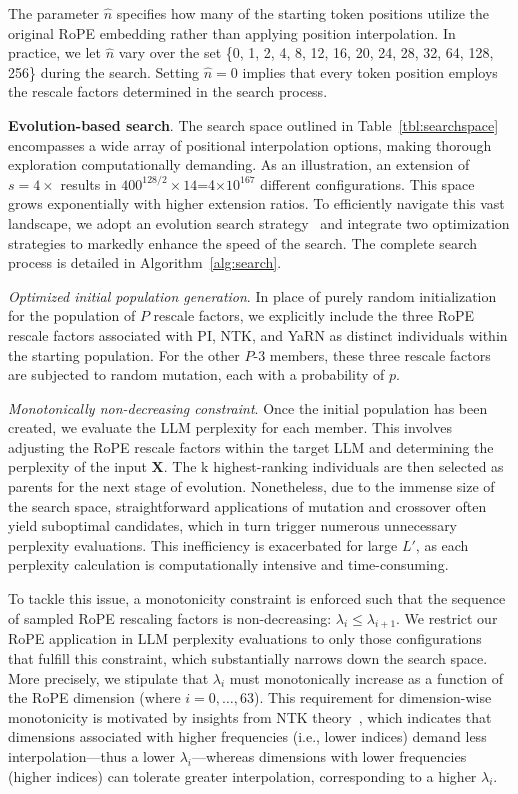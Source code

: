 The parameter $\hat{n}$ specifies how many of the starting token positions utilize the original RoPE embedding rather than applying position interpolation. In practice, we let $\hat{n}$ vary over the set \{0, 1, 2, 4, 8, 12, 16, 20, 24, 28, 32, 64, 128, 256\} during the search. Setting $\hat{n}=0$ implies that every token position employs the rescale factors determined in the search process.

\textbf{Evolution-based search}. The search space outlined in Table~\ref{tbl:searchspace} encompasses a wide array of positional interpolation options, making thorough exploration computationally demanding. As an illustration, an extension of $s=4\times$ results in $400^{128/2}\times14$=4$\times10^{167}$ different configurations. This space grows exponentially with higher extension ratios. To efficiently navigate this vast landscape, we adopt an evolution search strategy~\cite{guo2020single} and integrate two optimization strategies to markedly enhance the speed of the search. The complete search process is detailed in Algorithm~\ref{alg:search}.

\textit{Optimized initial population generation}. In place of purely random initialization for the population of $P$ rescale factors, we explicitly include the three RoPE rescale factors associated with PI, NTK, and YaRN as distinct individuals within the starting population. For the other $P$-3 members, these three rescale factors are subjected to random mutation, each with a probability of $p$.

\textit{Monotonically non-decreasing constraint}. Once the initial population has been created, we evaluate the LLM perplexity for each member. This involves adjusting the RoPE rescale factors within the target LLM and determining the perplexity of the input $\mathbf{X}$. The k highest-ranking individuals are then selected as parents for the next stage of evolution. Nonetheless, due to the immense size of the search space, straightforward applications of mutation and crossover often yield suboptimal candidates, which in turn trigger numerous unnecessary perplexity evaluations. This inefficiency is exacerbated for large $L'$, as each perplexity calculation is computationally intensive and time-consuming.

To tackle this issue, a monotonicity constraint is enforced such that the sequence of sampled RoPE rescaling factors is non-decreasing: $\lambda_i\le \lambda_{i+1}$. We restrict our RoPE application in LLM perplexity evaluations to only those configurations that fulfill this constraint, which substantially narrows down the search space. More precisely, we stipulate that $\lambda_i$ must monotonically increase as a function of the RoPE dimension (where $i = 0, \ldots, 63$). This requirement for dimension-wise monotonicity is motivated by insights from NTK theory~\cite{jacot2018neural,tancik2020fourier,ntk}, which indicates that dimensions associated with higher frequencies (i.e., lower indices) demand less interpolation—thus a lower $\lambda_i$—whereas dimensions with lower frequencies (higher indices) can tolerate greater interpolation, corresponding to a higher $\lambda_i$.

